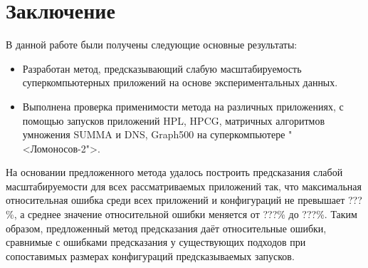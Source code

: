 \chapter{Заключение}
	В данной работе были получены следующие основные результаты:
	\begin{itemize}
		\item Разработан метод, предсказывающий слабую масштабируемость суперкомпьютерных приложений на основе экспериментальных данных.
		\item Выполнена проверка применимости метода на различных приложениях, с помощью запусков приложений HPL, HPCG, матричных алгоритмов умножения SUMMA и DNS, Graph500 на суперкомпьютере "<Ломоносов-2">.
	\end{itemize}

	На основании предложенного метода удалось построить предсказания слабой масштабируемости для всех рассматриваемых приложений так, что максимальная относительная ошибка среди всех приложений и конфигураций не превышает ???\%, а среднее значение относительной ошибки меняется от ???\% до ???\%. Таким образом, предложенный метод предсказания даёт относительные ошибки, сравнимые с ошибками предсказания у существующих подходов при сопоставимых размерах конфигураций предсказываемых запусков.

\clearpage